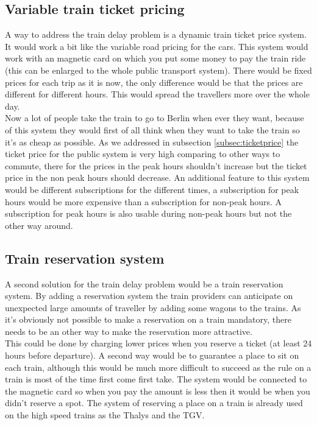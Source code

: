 \subsection{Variable train ticket pricing} \label{subsec:ticketPriceSolution}
A way to address the train delay problem is a dynamic train ticket price system. It would work a bit like the variable road pricing for the cars. This system would work with an magnetic card on which you put some money to pay the train ride (this can be enlarged to the whole public transport system). There would be fixed prices for each trip as it is now, the only difference would be that the prices are different for different hours. This would spread the travellers more over the whole day. \\ \newline
 Now a lot of people take the train to go to Berlin when ever they want, because of this system they would first of all think when they want to take the train so it's as cheap as possible. As we addressed in subsection \ref{subsec:ticketprice} the ticket price for the public system is very high comparing to other ways to commute, there for the prices in the peak hours shouldn't increase but the ticket price in the non peak hours should decrease. An additional feature to this system would be different subscriptions for the different times, a subscription for peak hours would be more expensive than a subscription for non-peak hours. A subscription for peak hours is also usable during non-peak hours but not the other way around. 
\subsection{Train reservation system}\label{subsec:resSys}
A second solution for the train delay problem would be a train reservation system. By adding a reservation system the train providers can anticipate on unexpected large amounts of traveller by adding some wagons to the trains. As it's obviously not possible to make a reservation on a train mandatory, there needs to be an other way to make the reservation more attractive. \\ \newline
This could be done by charging lower prices when you reserve a ticket (at least 24 hours before departure). A second way would be to guarantee a place to sit on each train, although this would be much more difficult to succeed as the rule on a train is most of the time first come first take. The system would be connected to the magnetic card so when you pay the amount is less then it would be when you didn't reserve a spot. The system of reserving a place on a train is already used on the high speed trains as the Thalys and the TGV.  
